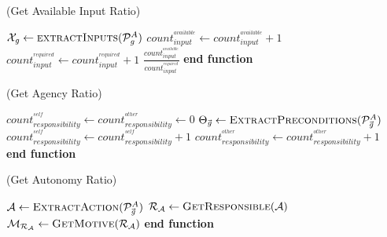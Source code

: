 \documentclass{article}
\begin{document}
\begin{algorithm}
	\caption{(Get Available Input Ratio)}
	\label{array-sum}
	\begin{algorithmic}[1]
			\Statex
			\State $\mathcal{X}_{\mathit{g}} \gets
			\Call{extractInputs}{\mathcal{P}_{\mathit{g}}^{A}}$
			\Statex
					\State $count_{input}^{^{available}} \gets count_{input}^{^{available}} + 1$
				\EndIf
				\State $count_{input}^{^{required}} \gets count_{input}^{^{required}} + 1$
			\EndFor
			\Statex
			\State \Return
			$\frac{count_{input}^{^{available}}}{count_{input}^{^{required}}}$
		\EndFunction 
	\State \textbf{end function}
	\end{algorithmic}
\end{algorithm}

\begin{algorithm}
	\caption{(Get Agency Ratio)}
	\label{array-sum}
	\begin{algorithmic}[1]
			\Statex
			\State $count_{responsibility}^{^{self}} \gets
			count_{responsibility}^{^{other}} \gets 0$
			\Statex
			\State $\Theta_{\vec{\mathit{g}}} \gets
			\Call{ExtractPreconditions}{\mathcal{P}_{\vec{\mathit{g}}}^{A}}$
			\Statex
					\State $count_{responsibility}^{^{self}} \gets count_{responsibility}^{^{self}} + 1$
				\Else
					\State $count_{responsibility}^{^{other}} \gets
				count_{responsibility}^{^{other}} + 1$
				\EndIf
			\EndFor
			\Statex
			\State {}
		\EndFunction 
	\State \textbf{end function}
	\end{algorithmic}
\end{algorithm}

\begin{algorithm}
	\caption{(Get Autonomy Ratio)}
	\label{array-sum}
	\begin{algorithmic}[1]
			\Statex
			\State $\mathcal{A} \gets
			\Call{ExtractAction}{\mathcal{P}_{\vec{\mathit{g}}}^{A}}$ 
			\State $\mathcal{R}_{\mathcal{A}} \gets \Call{GetResponsible}{\mathcal{A}}$
			\State $\mathcal{M}_{\mathcal{R}_{\mathcal{A}}} \gets
			\Call{GetMotive}{\mathcal{R}_{\mathcal{A}}}$
			\Statex
				\State {}
			\Else
				\State {}
			\EndIf
		\EndFunction 
	\State \textbf{end function}
	\end{algorithmic}
\end{algorithm}
\end{document}
